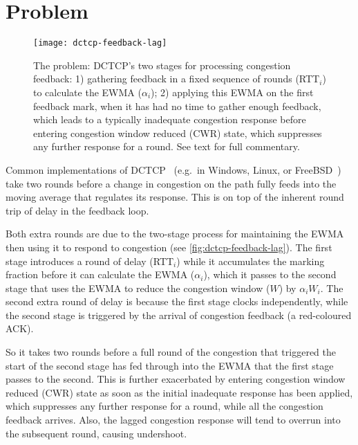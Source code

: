 \section{Problem}\label{prresp_Problem}

\begin{figure*}
	\texttt{[image: dctcp-feedback-lag]}
	\caption{The problem: DCTCP's two stages for processing congestion feedback: 1) gathering feedback in a fixed sequence of rounds (RTT\(_i\)) to calculate the EWMA (\(\alpha_i\)); 2) applying this EWMA on the first feedback mark, when it has had no time to gather enough feedback, which leads to a typically inadequate congestion response before entering congestion window reduced (CWR) state, which suppresses any further response for a round. See text for full commentary.}
	\label{fig:dctcp-feedback-lag}
\end{figure*}

Common implementations of DCTCP~\cite{Alizadeh10:DCTCP} (e.g.\ in Windows, Linux, or FreeBSD~\cite{Bensley17:DCTCP}) take two rounds before a change in congestion on the path fully feeds into the moving average that regulates its response. This is on top of the inherent round trip of delay in the feedback loop.

Both extra rounds are due to the two-stage process for maintaining the EWMA then using it to respond to congestion (see \autoref{fig:dctcp-feedback-lag}). The first stage introduces a round of delay (RTT\(_i\)) while it accumulates the marking fraction before it can calculate the EWMA (\(\alpha_i\)), which it passes to the second stage that uses the EWMA to reduce the congestion window (\(W\)) by \(\alpha_i W_i\). The second extra round of delay is because the first stage clocks independently, while the second stage is triggered by the arrival of congestion feedback (a red-coloured ACK).

So it takes two rounds before a full round of the congestion that triggered the start of the second stage has fed through into the EWMA that the first stage passes to the second. This is further exacerbated by entering congestion window reduced (CWR) state as soon as the initial inadequate response has been applied, which suppresses any further response for a round, while all the congestion feedback arrives. Also, the lagged congestion response will tend to overrun into the subsequent round, causing undershoot.

